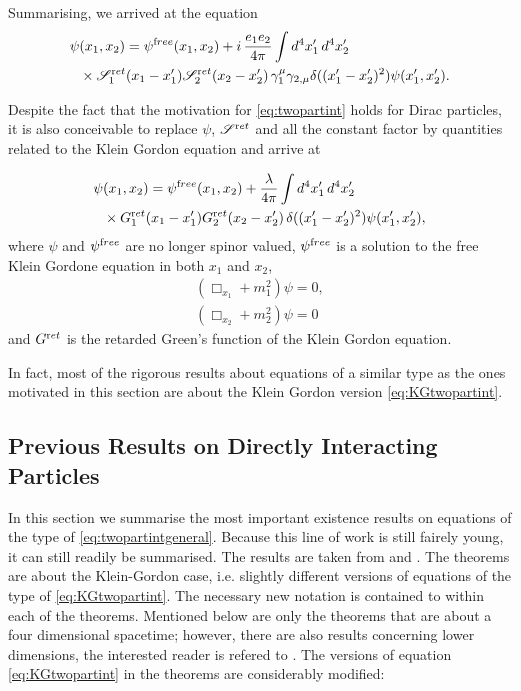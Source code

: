 \documentclass[b5paper,draft,openbib,12pt]{memoir}
\newcommand{\ret}{{\textup ret}}
\newcommand{\free}{{\textup free}}
\begin{document}
Summarising, we arrived at the equation
\begin{align}\label{eq:twopartint}
  \psi&(x_1,x_2) = \psi^\free(x_1,x_2)+i\, \frac{e_1e_2}{4\pi} \int d^4 x_1' \, d^4 x_2' \\\nonumber
  & \times \mathscr{S}^\ret_1(x_1-x_1') \mathscr{S}^\ret_2(x_2-x_2') \, \gamma_1^\mu \gamma_{2,\mu}\delta((x_1'-x_2')^2) \psi(x_1',x_2').
\end{align}


Despite the fact that the motivation for \eqref{eq:twopartint} holds for Dirac particles, 
it is also conceivable to replace \(\psi\), \(\mathscr{S}^\ret\) and all the constant factor by 
quantities related to the Klein Gordon equation and arrive at 

\begin{align}\label{eq:KGtwopartint}
  \psi&(x_1,x_2) = \psi^\free(x_1,x_2)+\frac{\lambda}{4\pi} \int d^4 x_1' \, d^4 x_2' \\\nonumber
  & \times G^\ret_1(x_1-x_1') G^\ret_2(x_2-x_2') \,\delta((x_1'-x_2')^2) \psi(x_1',x_2'),
\end{align}
where \(\psi\) and \(\psi^\free\) are no longer spinor valued, \(\psi^\free\) is a
solution to the free Klein Gordone equation in both \(x_1\) and \(x_2\),
\begin{align}
  (\Box_{x_1} + m_1^2)\psi=0,\\
  (\Box_{x_2} + m_2^2)\psi=0
\end{align}
and \(G^\ret\) is the retarded Green's function of the Klein Gordon equation.

In fact,  most of the rigorous results about equations of a similar 
type as the ones motivated in this section are about the Klein 
Gordon version \eqref{eq:KGtwopartint}.



\subsection{Previous Results on Directly Interacting Particles}\label{sec: direct interation previous}
In this section we summarise the most important existence results 
on equations of the type of 
\eqref{eq:twopartintgeneral}. Because this line of work is still 
fairely young,
it can still readily be summarised. The results are taken 
from \cite{direct_interaction_quantum} and 
\cite{lienertcurved}. The theorems are about the Klein-Gordon case, i.e.
slightly different versions of equations
of the type of \eqref{eq:KGtwopartint}. The 
necessary new notation is contained to within each
of the theorems. Mentioned below are only the theorems that are about a 
four dimensional spacetime; however,  
there are also results concerning lower dimensions, 
the interested reader 
is refered to \cite{direct_interaction_quantum,lienertcurved}. The versions of 
equation \eqref{eq:KGtwopartint} in the theorems are 
considerably modified:
\end{document}
